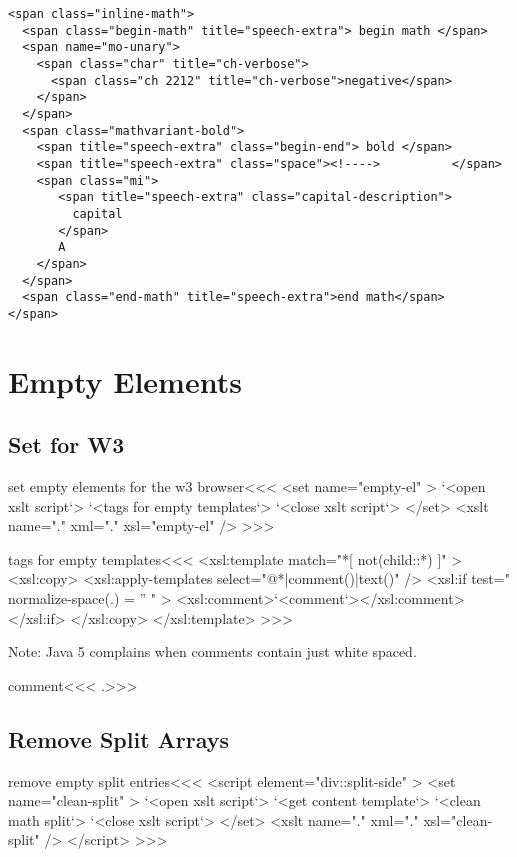 \documentclass{article}
\begin{document}
\begin{verbatim}
<span class="inline-math">
  <span class="begin-math" title="speech-extra"> begin math </span>
  <span name="mo-unary">
    <span class="char" title="ch-verbose">
      <span class="ch 2212" title="ch-verbose">negative</span>
    </span>
  </span>
  <span class="mathvariant-bold">
    <span title="speech-extra" class="begin-end"> bold </span>
    <span title="speech-extra" class="space"><!---->          </span>
    <span class="mi">
       <span title="speech-extra" class="capital-description"> 
         capital
       </span>
       A
    </span>
  </span>
  <span class="end-math" title="speech-extra">end math</span>
</span>
\end{verbatim}

\section{Empty Elements}


\subsection{Set for W3}



\<set empty elements for the w3 browser\><<<
<set name="empty-el" >
   `<open xslt script`>
   `<tags for empty templates`> 
   `<close xslt script`>
</set>
<xslt name="." xml="." xsl="empty-el" />
>>>

\<tags for empty templates\><<<
<xsl:template match="*[ not(child::*) ]" >
  <xsl:copy>
    <xsl:apply-templates select="@*|comment()|text()" />
    <xsl:if test=" normalize-space(.) = '' " >      
       <xsl:comment>`<comment`></xsl:comment>
    </xsl:if>
  </xsl:copy>
</xsl:template> 
>>>

Note: Java 5 complains when comments contain just white spaced.


\<comment\><<<
.>>>

\subsection{Remove Split Arrays}

\<remove empty split entries\><<<
<script element="div::split-side" >
  <set name="clean-split" >
     `<open xslt script`>
     `<get content template`>
     `<clean math split`> 
     `<close xslt script`>
  </set>
  <xslt name="." xml="." xsl="clean-split" />
</script> 
>>>
\end{document}
